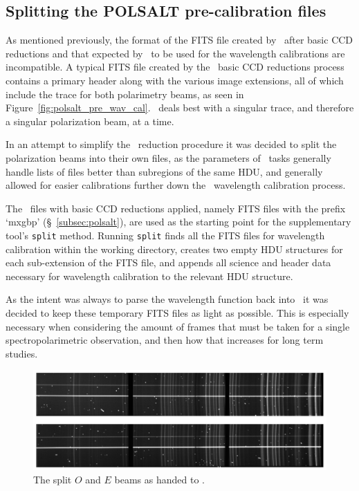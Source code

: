 \subsection{Splitting the POLSALT pre-calibration files}

As mentioned previously, the format of the \gls{FITS} file created by \polsalt\ after basic \gls{CCD} reductions and that expected by \iraf\ to be used for the wavelength calibrations are incompatible. A typical \gls{FITS} file created by the \polsalt\ basic \gls{CCD} reductions process contains a primary header along with the various image extensions, all of which include the trace for both polarimetry beams, as seen in Figure~\ref{fig:polsalt_pre_wav_cal}. \iraf\ deals best with a singular trace, and therefore a singular polarization beam, at a time.
\prgph

In an attempt to simplify the \iraf\ reduction procedure it was decided to split the polarization beams into their own files, as the parameters of \iraf\ tasks generally handle lists of files better than subregions of the same \gls{HDU}, and generally allowed for easier calibrations further down the \iraf\ wavelength calibration process.
\prgph

The \polsalt\ files with basic \gls{CCD} reductions applied, namely \gls{FITS} files with the prefix `mxgbp' (\S~\ref{subsec:polsalt}), are used as the starting point for the supplementary tool's \texttt{split} method. Running \texttt{split} finds all the \gls{FITS} files for wavelength calibration within the working directory, creates two empty \gls{HDU} structures for each sub-extension of the \gls{FITS} file, and appends all science and header data necessary for wavelength calibration to the relevant \gls{HDU} structure.
\prgph

As the intent was always to parse the wavelength function back into \polsalt\ it was decided to keep these temporary \gls{FITS} files as light as possible. This is especially necessary when considering the amount of frames that must be taken for a single spectropolarimetric observation, and then how that increases for long term studies.
\prgph

\begin{figure}[t]
    \centering
    \includegraphics[width = 1.0\textwidth]{figures/3_OEsplit.pdf}
    \caption{The split $O$ and $E$ beams as handed to \iraf.}
    \label{fig:OE_split}
\end{figure}

